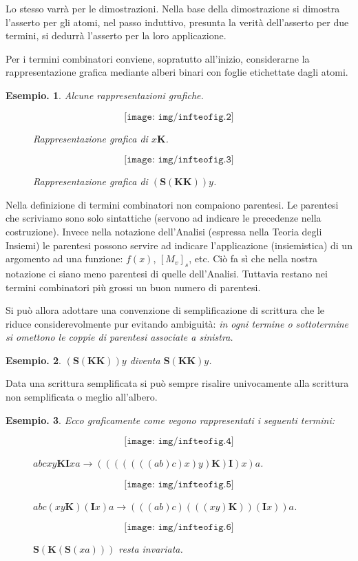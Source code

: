 \documentclass{book}
\newtheorem{esempio}{Esempio.}
\newcommand*{\ii}{\mathbf{I}}    %
\newcommand*{\kk}{\mathbf{K}}    %
\newcommand*{\sss}{\mathbf{S}}   %
\begin{document}
Lo stesso varr\`a per le dimostrazioni.
Nella base della dimostrazione si dimostra l'asserto per gli atomi, nel passo
induttivo, presunta la verit\`a dell'asserto per due termini, si dedurr\`a
l'asserto per la loro applicazione.

Per i termini combinatori conviene, sopratutto all'inizio, considerarne la
rappresentazione grafica mediante alberi binari con foglie etichettate dagli
atomi.

\begin{esempio}Alcune rappresentazioni grafiche.
\begin{figure}[!ht]
\[ \texttt{[image: img/infteofig.2]} \]
\caption{Rappresentazione grafica di $x\kk$.}

\[ \texttt{[image: img/infteofig.3]} \]
\caption{Rappresentazione grafica di $(\sss(\kk\kk))y$.}
\end{figure}

\end{esempio}

Nella definizione di termini combinatori non compaiono parentesi. Le parentesi
che scriviamo sono solo sintattiche (servono ad indicare le precedenze nella
costruzione). Invece nella notazione dell'Analisi (espressa nella Teoria degli
Insiemi) le parentesi possono servire ad indicare l'applicazione (insiemistica)
 di un argomento ad una funzione: $f(x)$, $ [M_{v}]_{s} $, etc.
Ci\`o fa s\`i che nella nostra notazione ci siano meno parentesi di quelle
dell'Analisi. Tuttavia restano nei termini combinatori pi\`u grossi un buon
numero di parentesi.

Si pu\`o allora adottare una convenzione di semplificazione di scrittura che
le riduce considerevolmente pur evitando ambiguit\`a:
\emph{in ogni termine o sottotermine si omettono le coppie di parentesi
associate a sinistra.}

\begin{esempio} $(\sss(\kk\kk))y$ diventa $\sss(\kk\kk)y$. \end{esempio}

Data una scrittura semplificata si pu\`o sempre risalire univocamente alla
scrittura non semplificata o meglio all'albero.
\begin{esempio}
Ecco graficamente come vegono rappresentati i seguenti termini:


\begin{figure}[!ht]
\[ \texttt{[image: img/infteofig.4]} \]
\caption{ $abcxy\kk\ii xa \longrightarrow (((((((ab)c)x)y)\kk)\ii)x)a$.}
\end{figure}

\begin{figure}[!ht]
\[ \texttt{[image: img/infteofig.5]} \]
\caption{$abc(xy\kk)(\ii x)a \longrightarrow (((ab)c)(((xy)\kk))(\ii x))a$.}
\end{figure}

\begin{figure}[!ht]
\[ \texttt{[image: img/infteofig.6]} \]
\caption{$\sss(\kk(\sss(xa)))$ resta invariata.}
\end{figure}

\end{esempio}
\end{document}
